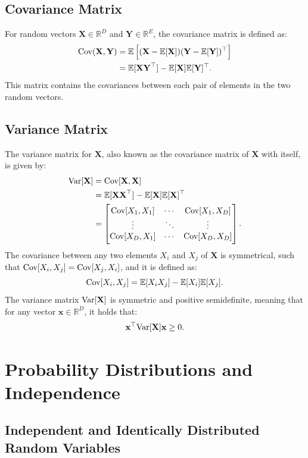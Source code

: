 \documentclass[12pt,openany]{book}
\theoremstyle{definition}
\newcommand{\E}{\mathbb{E}}
\newcommand{\Cov}{\textnormal{Cov}}
\newcommand{\Var}{\textnormal{Var}}
\renewcommand{\vec}[1]{\textbf{#1}}
\begin{document}
	\subsection{Covariance Matrix}
	For random vectors \( \vec{X} \in \mathbb{R}^D \) and \( \vec{Y} \in \mathbb{R}^E \), the covariance matrix is defined as:
	\begin{align*}
		\Cov(\vec{X},\vec{Y}) &= \E\left[(\vec{X} - \E[\vec{X}])(\vec{Y} - \E[\vec{Y}])^\top\right] \\
		&= \E[\vec{X}\vec{Y}^\top] - \E[\vec{X}]\E[\vec{Y}]^\top.
	\end{align*}
	This matrix contains the covariances between each pair of elements in the two random vectors.
	
	\subsection{Variance Matrix}
	The variance matrix for \( \vec{X} \), also known as the covariance matrix of \( \vec{X} \) with itself, is given by:
	\begin{align*}
		\Var[\vec{X}] &= \Cov[\vec{X},\vec{X}] \\
		&= \E[\vec{X}\vec{X}^\top] - \E[\vec{X}]\E[\vec{X}]^\top \\
		&= \begin{bmatrix}
			\Cov[X_1,X_1] & \cdots & \Cov[X_1,X_D] \\
			\vdots & \ddots & \vdots \\
			\Cov[X_D,X_1] & \cdots & \Cov[X_D,X_D] \\
		\end{bmatrix}.
	\end{align*}
	The covariance between any two elements \( X_i \) and \( X_j \) of \( \vec{X} \) is symmetrical, such that \( \Cov[X_i,X_j] = \Cov[X_j,X_i] \), and it is defined as:
	\[
	\Cov[X_i,X_j] = \E[X_iX_j] - \E[X_i]\E[X_j].
	\]
	The variance matrix \( \Var[\vec{X}] \) is symmetric and positive semidefinite, meaning that for any vector \( \vec{x} \in \mathbb{R}^D \), it holds that:
	\[
	\vec{x}^\top \Var[\vec{X}] \vec{x} \geq 0.
	\]
	
	\section{Probability Distributions and Independence}
	
	\subsection{Independent and Identically Distributed Random Variables}
	
\end{document}
